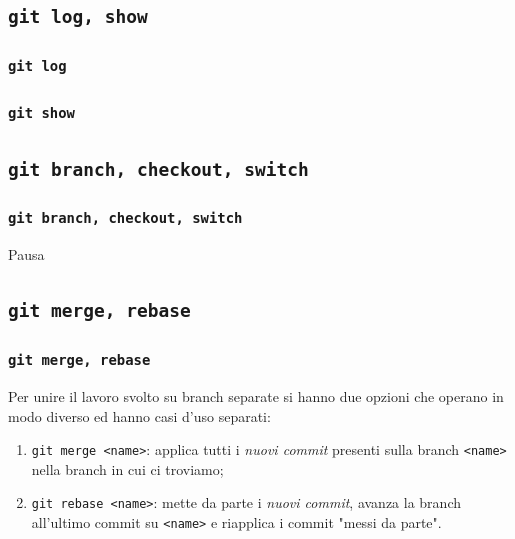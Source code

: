 \documentclass{beamer}
\begin{document}
\subsection{\texttt{git log, show}}
\begin{frame}
  \frametitle{\texttt{git log}}
\end{frame}

\begin{frame}
  \frametitle{\texttt{git show}}
\end{frame}

\subsection{\texttt{git branch, checkout, switch}}
\begin{frame}
  \frametitle{\texttt{git branch, checkout, switch}}
\end{frame}

\begin{frame}[c]
  \centering
  Pausa
\end{frame}

\subsection{\texttt{git merge, rebase}}
\begin{frame}
  \frametitle{\texttt{git merge, rebase}}
  Per unire il lavoro svolto su branch separate si hanno due opzioni che operano
  in modo diverso ed hanno casi d'uso separati:
  \begin{enumerate}
    \item<1-> \texttt{git merge <name>}: applica tutti i \emph{nuovi commit}\footnotemark{}
      presenti sulla branch \texttt{<name>} nella branch in cui ci troviamo;
    \item<2-> \texttt{git rebase <name>}: mette da parte i
      \emph{nuovi commit}\footnotemark[\value{footnote}], avanza la branch
      all'ultimo commit su \texttt{<name>} e riapplica i commit "messi da parte".
  \end{enumerate}
\end{frame}
\end{document}
